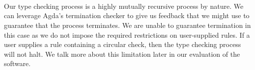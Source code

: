 \begin{code}
%
\>[6]\AgdaSpace{}%
\AgdaSpace{}%
\AgdaSpace{}%
\AgdaSpace{}%
\AgdaSpace{}%
\AgdaSpace{}%
\AgdaSpace{}%
\<%
\\
%
\>[6]\AgdaSpace{}%
\AgdaSpace{}%
\AgdaSpace{}%
\AgdaSymbol{(}\AgdaSpace{}%
\AgdaSpace{}%
\AgdaSymbol{(}\AgdaSpace{}%
\AgdaSymbol{))}\<%
\\
%
\>[6]\AgdaSymbol{\AgdaUnderscore{}}\AgdaSpace{}%
\AgdaSpace{}%
\AgdaSpace{}%
\AgdaSpace{}%
\AgdaSpace{}%
\<%
\\
%
\>[6]\AgdaSpace{}%
\<%
\end{code}
Our type checking process is a highly mutually recursive process by nature. We can
leverage Agda's termination checker to give us feedback that we might use to
guarantee that the process terminates. We are unable to guarantee termination
in this case as we do not impose the required restrictions on user-supplied rules. If
a user supplies a rule containing a circular check, then the type checking
process will not halt. We talk more about this limitation later in our evaluation
of the software.
